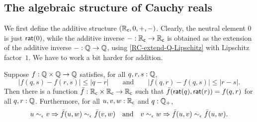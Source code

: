 \subsection{The algebraic structure of Cauchy reals}
\label{sec:algebr-struct-cauchy}

We first define the additive structure $(\mathbb{R}_\mathsf{c}, 0, {+}, {-})$. Clearly, the neutral element
$0$ is just $\mathsf{rat}(0)$, while the additive inverse ${-} : \mathbb{R}_\mathsf{c} \to \mathbb{R}_\mathsf{c}$ is obtained as the
extension of the additive inverse ${-} : \mathbb{Q} \to \mathbb{Q}$, using \autoref{RC-extend-Q-Lipschitz}
with Lipschitz factor~$1$. We have to work a bit harder for addition.

\begin{lem} \label{RC-binary-nonexpanding-extension}
  Suppose $f : \mathbb{Q} \times \mathbb{Q} \to \mathbb{Q}$ satisfies, for all $q, r, s : \mathbb{Q}$,
  \begin{equation*}
    |f(q, s) - f(r, s)| \leq |q - r|
    \qquad\text{and}\qquad
    |f(q, r) - f(q, s)| \leq |r - s|.
  \end{equation*}
  Then there is a function $\bar{f} : \mathbb{R}_\mathsf{c} \times \mathbb{R}_\mathsf{c} \to \mathbb{R}_\mathsf{c}$ such that
  $\bar{f}(\mathsf{rat}(q), \mathsf{rat}(r)) = f(q,r)$ for all $q, r : \mathbb{Q}$. Furthermore,
  for all $u, v, w : \mathbb{R}_\mathsf{c}$ and $q : \mathbb{Q}_{+}$,
  \begin{equation*}
    u \sim_{\epsilon} v \Rightarrow \bar{f}(u,w) \sim_{\epsilon} \bar{f}(v,w)
    \quad\text{and}\quad
    v \sim_{\epsilon} w \Rightarrow \bar{f}(u,v) \sim_{\epsilon} \bar{f}(u,w).
  \end{equation*}
\end{lem}

